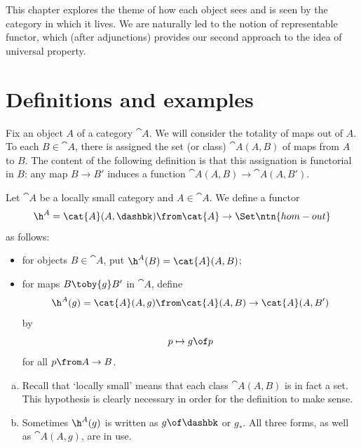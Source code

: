 This chapter explores the theme of how each object sees and is seen by the
category in which it lives.  We are naturally led to the notion of
representable functor, which (after adjunctions) provides our second
approach to the idea of universal property.



\section{Definitions and examples}
\label{sec:rep-defns}


Fix an object $A$ of a category $\cat{A}$.  We will consider the totality
of maps out of $A$.  To each $B \in \cat{A}$, there is assigned the set
(or class) $\cat{A}(A, B)$ of maps from $A$ to $B$.  The content of the
following definition is that this assignation is functorial in $B$: any map
$B \to B'$ induces a function $\cat{A}(A, B) \to \cat{A}(A, B')$.

\begin{defn}
\label{defn:hom-func}
Let $\cat{A}$ be a locally small category and $A \in \cat{A}$.  We define a
functor
\[
\h^A = \cat{A}(A, \dashbk)\from \cat{A} \to \Set%
%
\ntn{hom-out}
%
\]
as follows:
% 
\begin{itemize}
\item 
for objects $B \in \cat{A}$, put $\h^A(B) = \cat{A}(A, B)$;

\item 
for maps $B \toby{g} B'$ in $\cat{A}$, define
\[
\h^A(g) = \cat{A}(A, g)\from 
\cat{A}(A, B) \to \cat{A}(A, B')
\]
by 
\[
p 
\mapsto
g \of p
\]
for all $p\from A \to B$.
\end{itemize}
\end{defn}

\begin{remarks}
\begin{enumerate}[(b)]
\item 
Recall that `locally%
%
%
%
small' means that each class $\cat{A}(A, B)$ is in fact a set.  This
hypothesis is clearly necessary in order for the definition to make sense.

\item 
Sometimes $\h^A(g)$ is written as $g \of \dashbk$%
%
%
 or $g_*$.%
%
%
All three forms, as well as $\cat{A}(A, g)$, are in use.
\end{enumerate}
\end{remarks}

